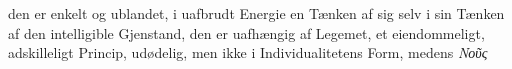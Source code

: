 \documentclass[12pt,a4paper]{book}
\newcommand{\gk}[1]{\textit{#1}}
\begin{document}
den er enkelt og ublandet, i uafbrudt Energie en Tænken af
sig selv i sin Tænken af den intelligible Gjenstand, den er
uafhængig af Legemet, et eiendommeligt, adskilleligt Princip,
udødelig, men ikke i Individualitetens Form, medens \gk{Νοῦς}
%
%
%
%
%
%
\end{document}
